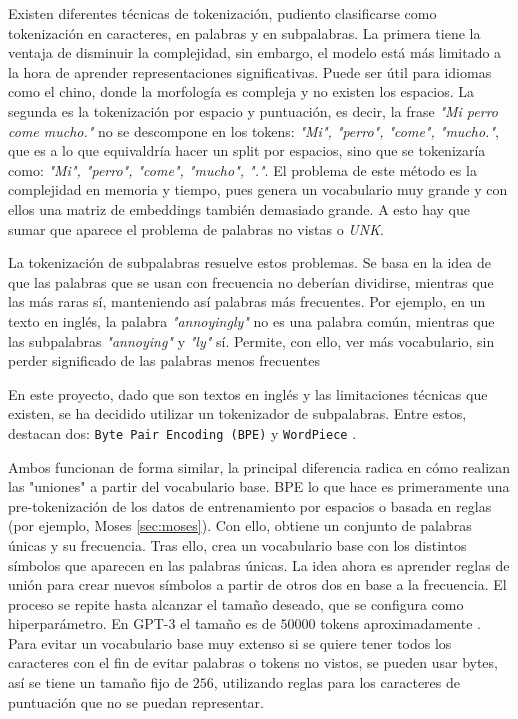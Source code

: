 \documentclass[11pt]{book}
\begin{document}
Existen diferentes técnicas de tokenización, pudiento clasificarse como tokenización en caracteres, en palabras y en subpalabras. La primera tiene la ventaja de disminuir la complejidad, sin embargo, el modelo está más limitado a la hora de aprender representaciones significativas. Puede ser útil para idiomas como el chino, donde la morfología es compleja y no existen los espacios. La segunda es la tokenización por espacio y puntuación, es decir, la frase \textit{"Mi perro come mucho."} no se descompone en los tokens: \textit{"Mi", "perro", "come", "mucho."}, que es a lo que equivaldría hacer un split por espacios, sino que se tokenizaría como: \textit{"Mi", "perro", "come", "mucho", "."}. El problema de este método es la complejidad en memoria y tiempo, pues genera un vocabulario muy grande y con ellos una matriz de embeddings también demasiado grande. A esto hay que sumar que aparece el problema de palabras no vistas o \textit{UNK}. 

La tokenización de subpalabras resuelve estos problemas. Se basa en la idea de que las palabras que se usan con frecuencia no deberían dividirse, mientras que las más raras sí, manteniendo así palabras más frecuentes. Por ejemplo, en un texto en inglés, la palabra \textit{"annoyingly"} no es una palabra común, mientras que las subpalabras \textit{"annoying"} y \textit{"ly"} sí. Permite, con ello, ver más vocabulario, sin perder significado de las palabras menos frecuentes \parencite{lmpo2020bpe}

En este proyecto, dado que son textos en inglés y las limitaciones técnicas que existen, se ha decidido utilizar un tokenizador de subpalabras. Entre estos, destacan dos: \texttt{Byte Pair Encoding (BPE)} y \texttt{WordPiece} \parencite{huggingface_tokenizer_summary}. 

Ambos funcionan de forma similar, la principal diferencia radica en cómo realizan las "uniones" a partir del vocabulario base. BPE lo que hace es primeramente una pre-tokenización de los datos de entrenamiento por espacios o basada en reglas (por ejemplo, Moses \ref{sec:moses}). Con ello, obtiene un conjunto de palabras únicas y su frecuencia. Tras ello, crea un vocabulario base con los distintos símbolos que aparecen en las palabras únicas. La idea ahora es aprender reglas de unión para crear nuevos símbolos a partir de otros dos en base a la frecuencia. El proceso se repite hasta alcanzar el tamaño deseado, que se configura como hiperparámetro. En GPT-3 el tamaño es de $50000$ tokens aproximadamente \parencite{paul2025vocabsize}. Para evitar un vocabulario base muy extenso si se quiere tener todos los caracteres con el fin de evitar palabras o tokens no vistos, se pueden usar bytes, así se tiene un tamaño fijo de $256$, utilizando reglas para los caracteres de puntuación que no se puedan representar.
\end{document}
